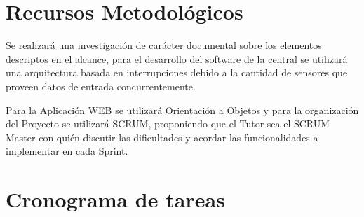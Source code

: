 \documentclass[a4paper,11pt, spanish]{article}
\begin{document}
\section{Recursos Metodológicos}
Se realizará una investigación de carácter documental sobre los elementos descriptos en el alcance, para el desarrollo del software de la central se utilizará una arquitectura basada en interrupciones debido a la cantidad de sensores que proveen datos de entrada concurrentemente.

Para la Aplicación WEB se utilizará Orientación a Objetos y para la organización del Proyecto se utilizará SCRUM, proponiendo que el Tutor sea el SCRUM Master con quién discutir las dificultades y acordar las funcionalidades a implementar en cada Sprint.  

\section{Cronograma de tareas}
\begin{gantt}{1}{7}
\begin{ganttitle}
\end{ganttitle}
\end{gantt}
\end{document}
